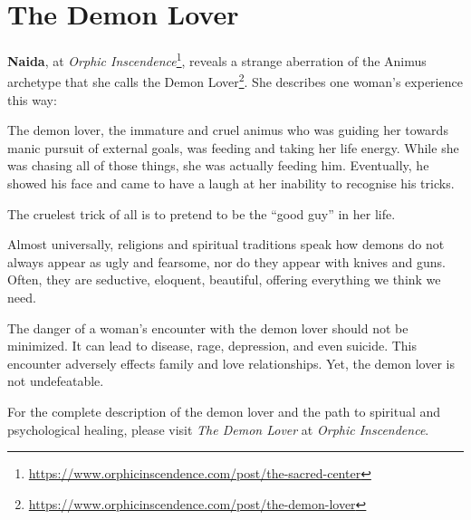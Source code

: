 \section{The Demon Lover}

\textbf{Naida}, at \textit{Orphic Inscendence}\footnote{\url{https://www.orphicinscendence.com/post/the-sacred-center}}, reveals a strange aberration of the Animus archetype that she calls the Demon Lover\footnote{\url{https://www.orphicinscendence.com/post/the-demon-lover}}. She describes one woman's experience this way:

\begin{quotex}
The demon lover, the immature and cruel animus who was guiding her towards manic pursuit of external goals, was feeding and taking her life energy. While she was chasing all of those things, she was actually feeding him. Eventually, he showed his face and came to have a laugh at her inability to recognise his tricks.
\end{quotex}


The cruelest trick of all is to pretend to be the ``good guy'' in her life.

\begin{quotex}
Almost universally, religions and spiritual traditions speak how demons do not always appear as ugly and fearsome, nor do they appear with knives and guns. Often, they are seductive, eloquent, beautiful, offering everything we think we need.
\end{quotex}


The danger of a woman's encounter with the demon lover should not be minimized. It can lead to disease, rage, depression, and even suicide. This encounter adversely effects family and love relationships. Yet, the demon lover is not undefeatable.

For the complete description of the demon lover and the path to spiritual and psychological healing, please visit \emph{The Demon Lover} at \textit{Orphic Inscendence}.


